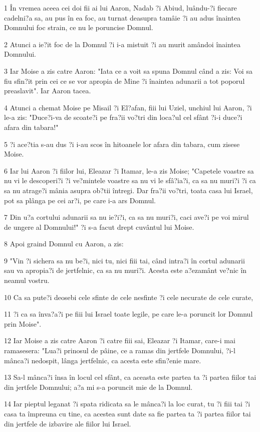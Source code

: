 \par 1 În vremea aceea cei doi fii ai lui Aaron, Nadab ?i Abiud, luându-?i fiecare cadelni?a sa, au pus în ea foc, au turnat deasupra tamâie ?i au adus înaintea Domnului foc strain, ce nu le poruncise Domnul.
\par 2 Atunci a ie?it foc de la Domnul ?i i-a mistuit ?i au murit amândoi înaintea Domnului.
\par 3 Iar Moise a zis catre Aaron: "Iata ce a voit sa spuna Domnul când a zis: Voi sa fiu sfin?it prin cei ce se vor apropia de Mine ?i înaintea adunarii a tot poporul preaslavit". Iar Aaron tacea.
\par 4 Atunci a chemat Moise pe Misail ?i El?afan, fiii lui Uziel, unchiul lui Aaron, ?i le-a zis: "Duce?i-va de scoate?i pe fra?ii vo?tri din loca?ul cel sfânt ?i-i duce?i afara din tabara!"
\par 5 ?i ace?tia s-au dus ?i i-au scos în hitoanele lor afara din tabara, cum zisese Moise.
\par 6 Iar lui Aaron ?i fiilor lui, Eleazar ?i Itamar, le-a zis Moise; "Capetele voastre sa nu vi le descoperi?i ?i ve?mintele voastre sa nu vi le sfâ?ia?i, ca sa nu muri?i ?i ca sa nu atrage?i mânia asupra ob?tii întregi. Dar fra?ii vo?tri, toata casa lui Israel, pot sa plânga pe cei ar?i, pe care i-a ars Domnul.
\par 7 Din u?a cortului adunarii sa nu ie?i?i, ca sa nu muri?i, caci ave?i pe voi mirul de ungere al Domnului!" ?i s-a facut drept cuvântul lui Moise.
\par 8 Apoi graind Domnul cu Aaron, a zis:
\par 9 "Vin ?i sichera sa nu be?i, nici tu, nici fiii tai, când intra?i în cortul adunarii sau va apropia?i de jertfelnic, ca sa nu muri?i. Acesta este a?ezamânt ve?nic în neamul vostru.
\par 10 Ca sa pute?i deosebi cele sfinte de cele nesfinte ?i cele necurate de cele curate,
\par 11 ?i ca sa înva?a?i pe fiii lui Israel toate legile, pe care le-a poruncit lor Domnul prin Moise".
\par 12 Iar Moise a zis catre Aaron ?i catre fiii sai, Eleazar ?i Itamar, care-i mai ramasesera: "Lua?i prinosul de pâine, ce a ramas din jertfele Domnului, ?i-l mânca?i nedospit, lânga jertfelnic, ca acesta este sfin?enie mare.
\par 13 Sa-l mânca?i însa în locul cel sfânt, ca aceasta este partea ta ?i partea fiilor tai din jertfele Domnului; a?a mi s-a poruncit mie de la Domnul.
\par 14 Iar pieptul leganat ?i spata ridicata sa le mânca?i la loc curat, tu ?i fiii tai ?i casa ta împreuna cu tine, ca acestea sunt date sa fie partea ta ?i partea fiilor tai din jertfele de izbavire ale fiilor lui Israel.
